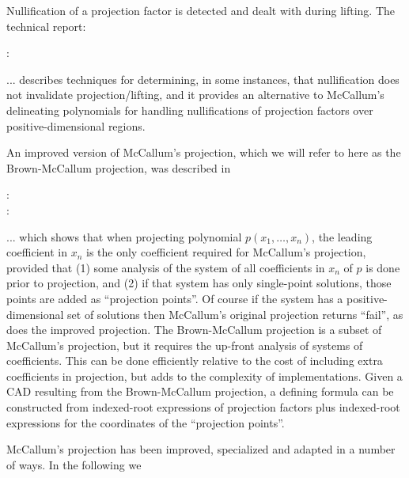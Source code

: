 \documentclass{article}
\begin{document}
Nullification of a projection factor is detected and dealt with during
lifting.  The technical report:
%
\begin{description}
\item[\autocite{Brown:01} :]  
\end{description}
%
... describes techniques for determining, in some instances, that
nullification does not invalidate projection/lifting, and it
provides an alternative to McCallum's delineating polynomials for
handling nullifications of projection factors over
positive-dimensional regions.  

An improved version of McCallum's projection, which we will refer to
here as the Brown-McCallum projection, was described in
%
\begin{description}
\item[\autocite{Brown:00a} :]  
\item[\autocite{Brown:00b} :]  
\end{description}
%
... which shows that when projecting polynomial $p(x_1,\ldots,x_n)$, the leading
coefficient in $x_n$ is the only coefficient required for McCallum's
projection, provided that (1) some analysis of the system of all
coefficients in $x_n$ of $p$ is done prior to projection, and (2) if
that system has only single-point solutions, those points are added
as ``projection points''.  Of course if the system has a
positive-dimensional set of solutions then McCallum's original
projection returns ``fail'', as does the improved projection.
The Brown-McCallum projection is a subset of McCallum's
projection, but it requires the up-front analysis of systems of
coefficients. This can be done efficiently relative to the cost of
including extra coefficients in projection, but adds to the complexity
of implementations. Given a CAD resulting from the
Brown-McCallum projection, a defining formula can be constructed from
indexed-root expressions of projection factors plus indexed-root
expressions for the coordinates of the ``projection points''. 

McCallum's projection has been improved, specialized and adapted in a
number of ways.  In the following we
\end{document}
